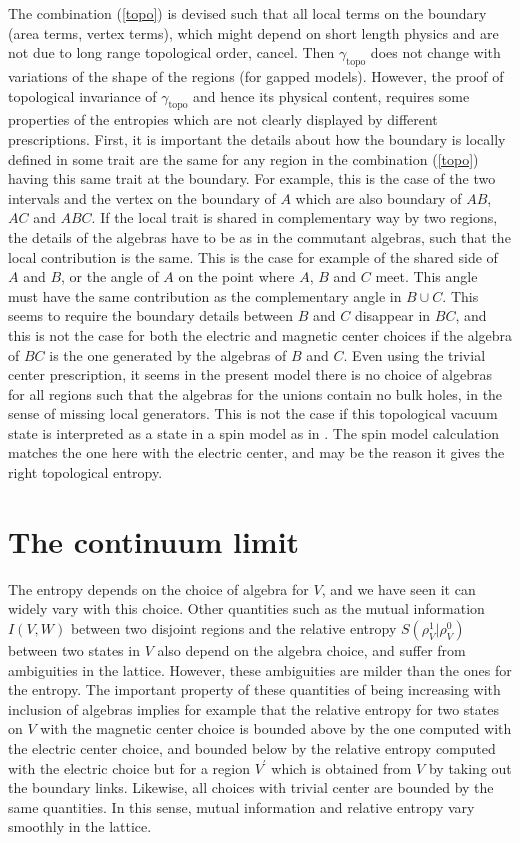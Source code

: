 \documentclass[12pt,a4paper]{article}
\begin{document}
The combination (\ref{topo}) is devised such that all local terms on the boundary (area terms, vertex terms), which might depend on short 
length physics and are not due to long range topological order, cancel. Then $\gamma_{\textrm{topo}}$ does not change with variations of the 
shape of the regions (for gapped models). However, the proof of topological invariance of $\gamma_{\textrm{topo}}$ and hence its physical content, 
requires some properties of the entropies which are not clearly displayed by different prescriptions.  First, it is important the details about how 
the boundary is locally defined in some trait are the same for any region in the combination (\ref{topo}) having this same trait at the boundary. 
For example, this is the case of the two intervals and the vertex on the boundary of $A$ which are also boundary of $AB$, $AC$ and $ABC$. If the local trait 
is shared in complementary way by two regions, the details of the algebras have to be as in the commutant algebras, such that the local 
contribution is the same. This is the case for example of the shared side of $A$ and $B$, or the   
 angle of $A$ on the point where $A$, $B$ and $C$ meet. This angle must have the same contribution as the complementary angle in $B\cup C$. 
 This seems to require the boundary details between $B$ and $C$ disappear in $BC$, and this is not the case for both the electric and magnetic center 
 choices if the algebra of $BC$ is the one generated by the algebras of $B$ and $C$. Even using the trivial center prescription, it seems in the present model there is no choice of algebras for all regions such that the algebras for the unions contain no bulk holes, in the sense of missing local generators. This is not the case if this topological vacuum state is interpreted as a state in a spin model as in \cite{Wen}. The spin model calculation matches the one here with the electric center, and may be the reason it gives the right topological entropy.   

\section{The continuum limit}

The entropy depends on the choice of algebra for $V$, and we have seen it can widely vary with this choice. Other quantities such as 
the mutual information $I(V,W)$ between two disjoint regions and the relative entropy $S(\rho^1_V|\rho^0_V)$ between two states in $V$ 
also depend on the algebra choice, and suffer from ambiguities in the lattice. However, these ambiguities are milder than the ones for 
the entropy. The important property of these quantities of being increasing with inclusion of algebras implies for example that 
the relative entropy for two states on $V$ with the magnetic center choice is bounded above by the one computed with the electric 
center choice, and bounded below by the relative entropy computed with the electric choice but for a region $V^\prime$ which is 
obtained from $V$ by taking out the boundary links. Likewise, all choices with trivial center are bounded by the same quantities. In 
this sense, mutual information and relative entropy vary smoothly in the lattice. 
\end{document}
